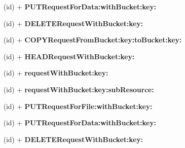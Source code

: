 \begin{DoxyCompactItemize}
\item 
\hypertarget{interface_a_s_i_s3_object_request_a06b5bf032c9b54a0fd0b17e0d1fecad5}{
(id) + {\bfseries \-P\-U\-T\-Request\-For\-Data\-:with\-Bucket\-:key\-:}}
\label{interface_a_s_i_s3_object_request_a06b5bf032c9b54a0fd0b17e0d1fecad5}

\item 
\hypertarget{interface_a_s_i_s3_object_request_a0602fac9aee5730f513b0a49e2be0dd9}{
(id) + {\bfseries \-D\-E\-L\-E\-T\-E\-Request\-With\-Bucket\-:key\-:}}
\label{interface_a_s_i_s3_object_request_a0602fac9aee5730f513b0a49e2be0dd9}

\item 
\hypertarget{interface_a_s_i_s3_object_request_a0048cc08b9cfef9c78abd81faa472d48}{
(id) + {\bfseries \-C\-O\-P\-Y\-Request\-From\-Bucket\-:key\-:to\-Bucket\-:key\-:}}
\label{interface_a_s_i_s3_object_request_a0048cc08b9cfef9c78abd81faa472d48}

\item 
\hypertarget{interface_a_s_i_s3_object_request_a88538201f1def9da2ff385880b78c8ef}{
(id) + {\bfseries \-H\-E\-A\-D\-Request\-With\-Bucket\-:key\-:}}
\label{interface_a_s_i_s3_object_request_a88538201f1def9da2ff385880b78c8ef}

\item 
\hypertarget{interface_a_s_i_s3_object_request_a8fc06d7585b85db69f81678fc1560ab0}{
(id) + {\bfseries request\-With\-Bucket\-:key\-:}}
\label{interface_a_s_i_s3_object_request_a8fc06d7585b85db69f81678fc1560ab0}

\item 
\hypertarget{interface_a_s_i_s3_object_request_aac357e6e8d9eab201a5d97c6e2ad1574}{
(id) + {\bfseries request\-With\-Bucket\-:key\-:sub\-Resource\-:}}
\label{interface_a_s_i_s3_object_request_aac357e6e8d9eab201a5d97c6e2ad1574}

\item 
\hypertarget{interface_a_s_i_s3_object_request_a07ff4bdb86902d59cb602be9bdc7ac14}{
(id) + {\bfseries \-P\-U\-T\-Request\-For\-File\-:with\-Bucket\-:key\-:}}
\label{interface_a_s_i_s3_object_request_a07ff4bdb86902d59cb602be9bdc7ac14}

\item 
\hypertarget{interface_a_s_i_s3_object_request_a06b5bf032c9b54a0fd0b17e0d1fecad5}{
(id) + {\bfseries \-P\-U\-T\-Request\-For\-Data\-:with\-Bucket\-:key\-:}}
\label{interface_a_s_i_s3_object_request_a06b5bf032c9b54a0fd0b17e0d1fecad5}

\item 
\hypertarget{interface_a_s_i_s3_object_request_a0602fac9aee5730f513b0a49e2be0dd9}{
(id) + {\bfseries \-D\-E\-L\-E\-T\-E\-Request\-With\-Bucket\-:key\-:}}
\label{interface_a_s_i_s3_object_request_a0602fac9aee5730f513b0a49e2be0dd9}


\end{DoxyCompactItemize}
